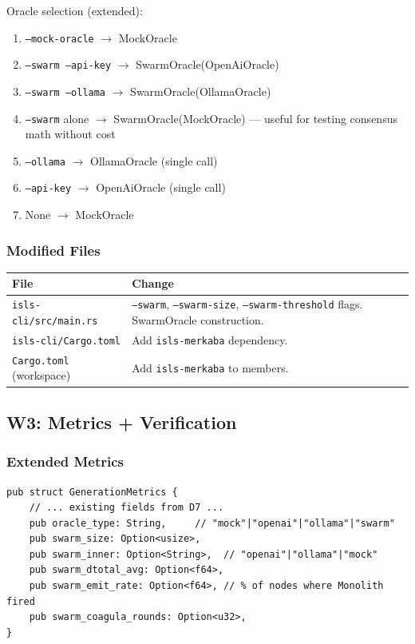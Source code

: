 \documentclass[11pt,a4paper]{article}
\begin{document}
Oracle selection (extended):
\begin{enumerate}[nosep]
\item \texttt{--mock-oracle} $\to$ MockOracle
\item \texttt{--swarm --api-key} $\to$ SwarmOracle(OpenAiOracle)
\item \texttt{--swarm --ollama} $\to$ SwarmOracle(OllamaOracle)
\item \texttt{--swarm} alone $\to$ SwarmOracle(MockOracle) --- useful 
      for testing consensus math without cost
\item \texttt{--ollama} $\to$ OllamaOracle (single call)
\item \texttt{--api-key} $\to$ OpenAiOracle (single call)
\item None $\to$ MockOracle
\end{enumerate}

\subsubsection{Modified Files}

\begin{longtable}{lp{10cm}}
\toprule
\textbf{File} & \textbf{Change} \\
\midrule
\texttt{isls-cli/src/main.rs}
  & \texttt{--swarm}, \texttt{--swarm-size}, 
    \texttt{--swarm-threshold} flags. SwarmOracle construction. \\
\texttt{isls-cli/Cargo.toml}
  & Add \texttt{isls-merkaba} dependency. \\
\texttt{Cargo.toml} (workspace)
  & Add \texttt{isls-merkaba} to members. \\
\bottomrule
\end{longtable}


\subsection{W3: Metrics + Verification}

\subsubsection{Extended Metrics}

\begin{lstlisting}[style=rust]
pub struct GenerationMetrics {
    // ... existing fields from D7 ...
    pub oracle_type: String,     // "mock"|"openai"|"ollama"|"swarm"
    pub swarm_size: Option<usize>,
    pub swarm_inner: Option<String>,  // "openai"|"ollama"|"mock"
    pub swarm_dtotal_avg: Option<f64>,
    pub swarm_emit_rate: Option<f64>, // % of nodes where Monolith fired
    pub swarm_coagula_rounds: Option<u32>,
}
\end{lstlisting}
\end{document}
